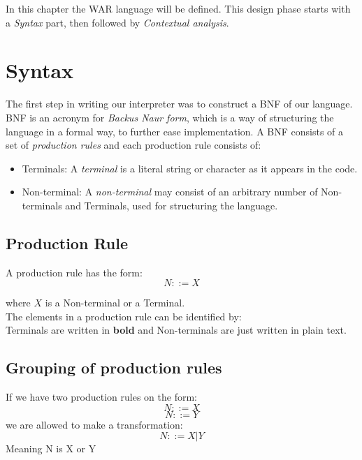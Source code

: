 In this chapter the WAR language will be defined. This design phase starts with a {\it Syntax} part, then followed by {\it Contextual analysis}.
\section{Syntax}
	The first step in writing our interpreter was to construct a BNF of our language. 
	BNF is an acronym for {\it Backus Naur form}, which is a way of
	structuring the language in a formal way, to further ease implementation. 
	A BNF consists of a set of {\it production rules} and each
	production rule consists of: \\
	\begin{itemize}
		 \item Terminals: A {\it terminal } is a literal string or character as it appears in the code.
		 \item Non-terminal: A {\it non-terminal } may consist of an arbitrary number of Non-terminals and Terminals, used for structuring the language.
	\end{itemize}
	
	\subsection*{Production Rule}
		A production rule has the form: \\
		\begin{equation}
			N ::= X
		\end{equation}
		
		where $X$ is a Non-terminal or a Terminal. \\
		
		The elements in a production rule can be identified by: \\
		Terminals are written in {\bf bold } and 
		Non-terminals are just written in plain text.
	\subsection*{Grouping of production rules}
		If we have two production rules on the form:\\
		\begin{equation}
			N ::= X 
		\end{equation}
		\begin{equation}
			N ::= Y 
		\end{equation}
		we are allowed to make a transformation: \\
		\begin{equation}
			N ::= X | Y 
		\end{equation}
		Meaning N is X or Y \\
		
